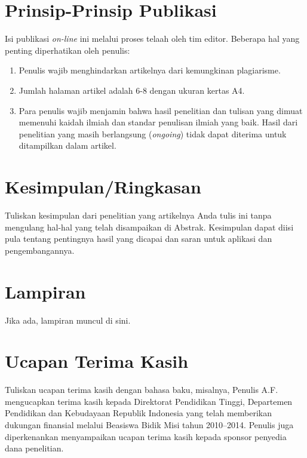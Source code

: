 \documentclass{its-jurnal}
\begin{document}
\section{Prinsip-Prinsip Publikasi}
Isi publikasi \textit{on-line} ini melalui proses telaah oleh tim editor. Beberapa hal yang penting diperhatikan oleh penulis:
\begin{enumerate}
  \item Penulis wajib menghindarkan artikelnya dari kemungkinan plagiarisme.
  \item Jumlah halaman artikel adalah 6-8 dengan ukuran kertas A4.
  \item Para penulis wajib menjamin bahwa hasil penelitian dan tulisan yang dimuat memenuhi kaidah ilmiah dan standar penulisan ilmiah yang baik. Hasil dari penelitian yang masih berlangsung (\textit{ongoing}) tidak dapat diterima untuk ditampilkan dalam artikel.
\end{enumerate}

\section{Kesimpulan/Ringkasan}
Tuliskan kesimpulan dari penelitian yang artikelnya Anda tulis ini tanpa mengulang hal-hal yang telah disampaikan di Abstrak. Kesimpulan dapat diisi pula tentang pentingnya hasil yang dicapai dan saran untuk aplikasi dan pengembangannya.

\section*{Lampiran}
Jika ada, lampiran muncul di sini.

\section*{Ucapan Terima Kasih}
Tuliskan ucapan terima kasih dengan bahasa baku, misalnya, Penulis A.F. mengucapkan terima kasih kepada Direktorat Pendidikan Tinggi, Departemen Pendidikan dan Kebudayaan Republik Indonesia yang telah memberikan dukungan finansial melalui Beasiswa Bidik Misi tahun 2010--2014. Penulis juga diperkenankan menyampaikan ucapan terima kasih kepada sponsor penyedia dana penelitian.

\nocite{*}


\end{document}
